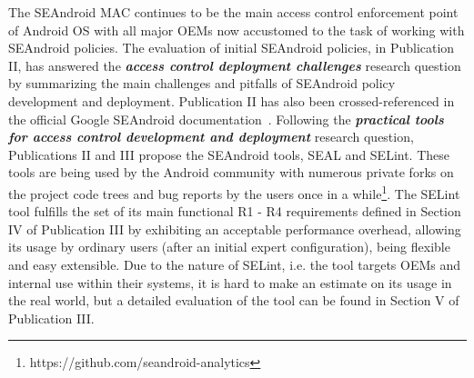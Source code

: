 The SEAndroid MAC continues to be the main access control enforcement point of Android OS with all major OEMs now accustomed to the task of working with SEAndroid policies. The evaluation of initial SEAndroid policies, in Publication II, has answered the \textit{\textbf{access control deployment challenges}} research question by summarizing the main challenges and pitfalls of SEAndroid policy development and deployment. Publication II has also been crossed-referenced in the official Google SEAndroid documentation~\cite{seanroidsize}. Following the \textbf{\textit{practical tools for access control development and deployment}} research question, Publications II and III propose the SEAndroid tools, SEAL and SELint. These tools are being used by the Android community with numerous private forks on the project code trees and bug reports by the users once in a while\footnote{https://github.com/seandroid-analytics}. The SELint tool fulfills the set of its main functional R1 - R4 requirements defined in Section IV of Publication III by exhibiting an acceptable performance overhead, allowing its usage by ordinary users (after an initial expert configuration), being flexible and easy extensible. Due to the nature of SELint, i.e. the tool targets OEMs and internal use within their systems, it is hard to make an estimate on its usage in the real world, but a detailed evaluation of the tool can be found in Section V of Publication III. 

